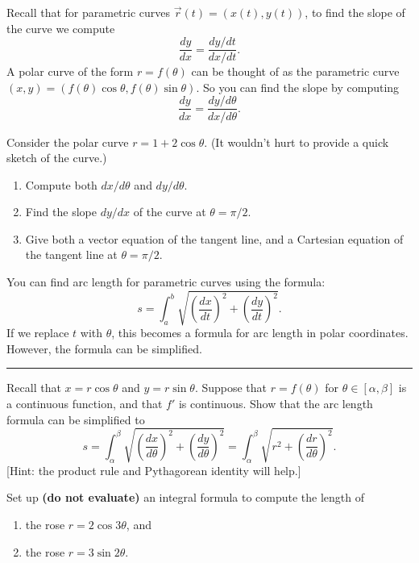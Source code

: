Recall that for parametric curves $\vec r(t) = (x(t),y(t))$, to find the slope of the curve we compute $$\frac{dy}{dx}=\frac{dy/dt}{dx/dt}.$$ A polar curve of the form $r=f(\theta)$ can be thought of as the parametric curve $(x,y) = (f(\theta)\cos\theta,f(\theta)\sin\theta)$. So you can find the slope by computing
$$\frac{dy}{dx}=\frac{dy/d\theta}{dx/d\theta}.$$

\begin{problem}
%
Consider the polar curve $r=1+2\cos \theta$. (It wouldn't hurt to provide a quick sketch of the curve.)
\begin{enumerate}
\item Compute both $dx/d\theta$ and $dy/d\theta$.
\item Find the slope $dy/dx$ of the curve at $\theta=\pi/2$.
\item Give both a vector equation of the tangent line, and a Cartesian equation of the tangent line at $\theta=\pi/2$.
\end{enumerate}
\end{problem}

You can find arc length for parametric curves using the formula: 
$$s=\int_a^b\sqrt{\left(\frac{dx}{dt}\right)^2+\left(\frac{dy}{dt}\right)^2}.$$ If we replace $t$ with $\theta$, this becomes a formula for arc length in polar coordinates.  However, the formula can be simplified.

\hrule

\begin{problem}
%
Recall that $x=r\cos\theta$ and $y=r\sin\theta$. Suppose that $r=f(\theta)$ for $\theta\in[\alpha,\beta]$ is a continuous function, and that $f'$ is continuous.  
Show that the arc length formula can be simplified to 
$$
s=\int_{\alpha}^{\beta}\sqrt{\left(\frac{dx}{d\theta}\right)^2+\left(\frac{dy}{d\theta}\right)^2} 
= \int_{\alpha}^{\beta}\sqrt{r^2+\left(\frac{dr}{d\theta}\right)^2} .$$
[Hint: the product rule and Pythagorean identity will help.]
\end{problem}

\begin{problem} 
%
Set up \textbf{(do not evaluate)} an integral formula to compute the length of 
\begin{enumerate}
\item the rose $r=2\cos 3\theta$, and
\item the rose $r=3\sin 2\theta$.
\end{enumerate}
\end{problem}

